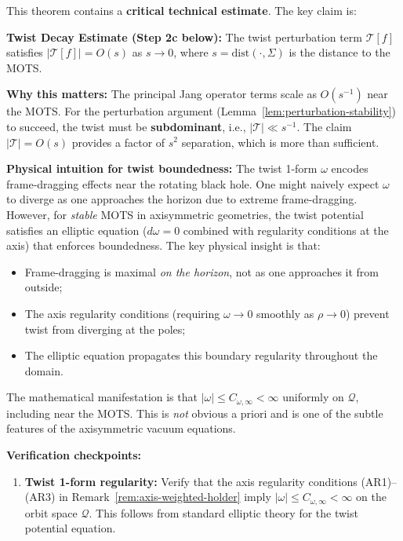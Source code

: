 \begin{remark}\label{rem:twist-verification-guide}
This theorem contains a \textbf{critical technical estimate}. The key claim is:

\textbf{Twist Decay Estimate (Step 2c below):} The twist perturbation term $\mathcal{T}[f]$ satisfies $|\mathcal{T}[f]| = O(s)$ as $s \to 0$, where $s = \mathrm{dist}(\cdot, \Sigma)$ is the distance to the MOTS.

\textbf{Why this matters:} The principal Jang operator terms scale as $O(s^{-1})$ near the MOTS. For the perturbation argument (Lemma~\ref{lem:perturbation-stability}) to succeed, the twist must be \textbf{subdominant}, i.e., $|\mathcal{T}| \ll s^{-1}$. The claim $|\mathcal{T}| = O(s)$ provides a factor of $s^2$ separation, which is more than sufficient.

\textbf{Physical intuition for twist boundedness:} The twist 1-form $\omega$ encodes frame-dragging effects near the rotating black hole. One might naively expect $\omega$ to diverge as one approaches the horizon due to extreme frame-dragging. However, for \emph{stable} MOTS in axisymmetric geometries, the twist potential satisfies an elliptic equation ($d\omega = 0$ combined with regularity conditions at the axis) that enforces boundedness. The key physical insight is that:
\begin{itemize}
\item Frame-dragging is maximal \emph{on the horizon}, not as one approaches it from outside;
\item The axis regularity conditions (requiring $\omega \to 0$ smoothly as $\rho \to 0$) prevent twist from diverging at the poles;
\item The elliptic equation propagates this boundary regularity throughout the domain.
\end{itemize}
The mathematical manifestation is that $|\omega| \leq C_{\omega,\infty} < \infty$ uniformly on $\mathcal{Q}$, including near the MOTS. This is \emph{not} obvious a priori and is one of the subtle features of the axisymmetric vacuum equations.

\textbf{Verification checkpoints:}
\begin{enumerate}
    \item[(V1)] \textbf{Twist 1-form regularity:} Verify that the axis regularity conditions (AR1)--(AR3) in Remark~\ref{rem:axis-weighted-holder} imply $|\omega| \leq C_{\omega,\infty} < \infty$ on the orbit space $\mathcal{Q}$. This follows from standard elliptic theory for the twist potential equation.
    

\end{enumerate}
\end{remark}
